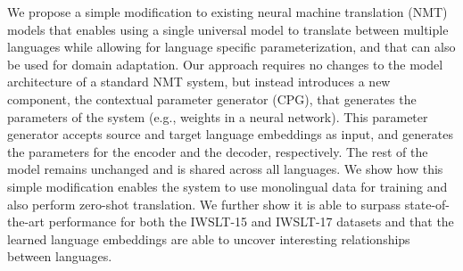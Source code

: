 We propose a simple modification to existing neural machine translation (NMT) models that enables using a single universal model to translate between multiple languages while allowing for language specific parameterization, and that can also be used for domain adaptation. Our approach requires no changes to the model architecture of a standard NMT system, but instead introduces a new component, the contextual parameter generator (CPG), that generates the parameters of the system (e.g., weights in a neural network). This parameter generator accepts source and target language embeddings as input, and generates the parameters for the encoder and the decoder, respectively. The rest of the model remains unchanged and is shared across all languages. We show how this simple modification enables the system to use monolingual data for training and also perform zero-shot translation. We further show it is able to surpass state-of-the-art performance for both the IWSLT-15 and IWSLT-17 datasets and that the learned language embeddings are able to uncover interesting relationships between languages.
